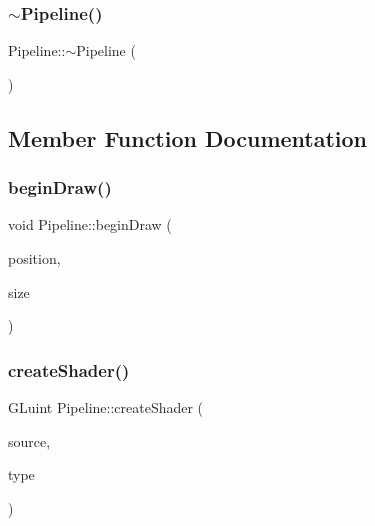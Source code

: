\subsubsection{\texorpdfstring{$\sim$\+Pipeline()}{~Pipeline()}}
{\footnotesize\ttfamily Pipeline\+::$\sim$\+Pipeline (\begin{DoxyParamCaption}{ }\end{DoxyParamCaption})}



\subsection{Member Function Documentation}
\mbox{\label{class_pipeline_a5fb0c15f2cb7af2c7f4a7a365a6115d1}} 
\subsubsection{\texorpdfstring{begin\+Draw()}{beginDraw()}}
{\footnotesize\ttfamily void Pipeline\+::begin\+Draw (\begin{DoxyParamCaption}\item[{glm\+::vec2}]{position,  }\item[{glm\+::vec2}]{size }\end{DoxyParamCaption})}

\mbox{\label{class_pipeline_a6b08f1cee6613c60bca5bde2579bbda2}} 
\subsubsection{\texorpdfstring{create\+Shader()}{createShader()}}
{\footnotesize\ttfamily G\+Luint Pipeline\+::create\+Shader (\begin{DoxyParamCaption}\item[{const char $\ast$}]{source,  }\item[{G\+Lenum}]{type }\end{DoxyParamCaption})\hspace{0.3cm}{\ttfamily [private]}}

\mbox{\label{class_pipeline_a171de6cafdea4a00d1a23bedc1fa63b5}} 
